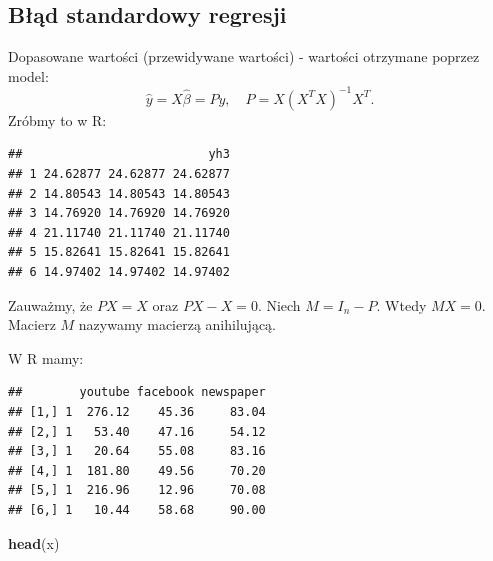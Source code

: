 \documentclass[]{article}
\newenvironment{Shaded}{\begin{snugshade}}{\end{snugshade}}
\newcommand{\KeywordTok}[1]{\textcolor[rgb]{0.13,0.29,0.53}{\textbf{#1}}}
\newcommand{\StringTok}[1]{\textcolor[rgb]{0.31,0.60,0.02}{#1}}
\newcommand{\OperatorTok}[1]{\textcolor[rgb]{0.81,0.36,0.00}{\textbf{#1}}}
\newcommand{\NormalTok}[1]{#1}
\begin{document}
\subsection{Błąd standardowy regresji}\label{bad-standardowy-regresji}

Dopasowane wartości (przewidywane wartości) - wartości otrzymane poprzez
model: \[\hat{y}=X\hat{\beta}=Py, \quad P=X(X^TX)^{-1}X^T.\] Zróbmy to w
R:

\begin{Shaded}
\end{Shaded}

\begin{verbatim}
##                          yh3
## 1 24.62877 24.62877 24.62877
## 2 14.80543 14.80543 14.80543
## 3 14.76920 14.76920 14.76920
## 4 21.11740 21.11740 21.11740
## 5 15.82641 15.82641 15.82641
## 6 14.97402 14.97402 14.97402
\end{verbatim}

Zauważmy, że \(PX=X\) oraz \(PX-X=0\). Niech \(M=I_n-P\). Wtedy
\(MX=0\). Macierz \(M\) nazywamy macierzą anihilującą.

W R mamy:

\begin{Shaded}
\end{Shaded}

\begin{verbatim}
##        youtube facebook newspaper
## [1,] 1  276.12    45.36     83.04
## [2,] 1   53.40    47.16     54.12
## [3,] 1   20.64    55.08     83.16
## [4,] 1  181.80    49.56     70.20
## [5,] 1  216.96    12.96     70.08
## [6,] 1   10.44    58.68     90.00
\end{verbatim}

\begin{Shaded}
\begin{Highlighting}[]
\KeywordTok{head}\NormalTok{(x)}
\end{Highlighting}
\end{Shaded}
\end{document}
